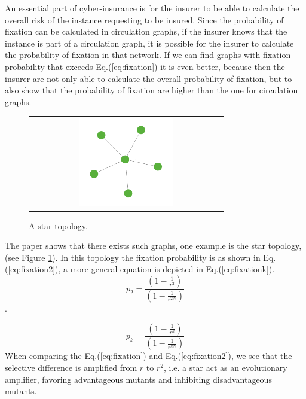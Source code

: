 An essential part of cyber-insurance is for the insurer to be able to calculate the overall risk of the instance requesting to be insured. Since the probability of fixation can be calculated in circulation graphs, if the insurer knows that the instance is part of a circulation graph, it is possible for the insurer to calculate the probability of fixation in that network. 
If we can find graphs with fixation probability that exceeds Eq.(\ref{eq:fixation}) it is even better, because then the insurer are not only able to calculate the overall probability of fixation, but to also show that the probability of fixation are higher than the one for circulation graphs.
\begin{figure}[b]
\centering
\begin{tabular}{@{}c@{}}
\includegraphics[width=0.5\textwidth]{../Figures/aStar.png}
\end{tabular}
\caption{
\label{fig:star} A star-topology. 
}
\end{figure}
The paper shows that there exists such graphs, one example is the star topology, (see Figure \ref{fig:star}).
In this topology the fixation probability is as shown in Eq.(\ref{eq:fixation2}), a more general equation is depicted in Eq.(\ref{eq:fixationk}). \begin{equation}p_{2}=\frac{(1-\frac{1}{r^{2}})}{(1-\frac{1}{r^{2N}})} \label{eq:fixation2} \end{equation}.

\begin{equation}
p_{k}=\frac{(1-\frac{1}{r^{k}})}{(1-\frac{1}{r^{kN}})} \label{eq:fixationk}
\end{equation}
 When comparing the Eq.(\ref{eq:fixation}) and Eq.(\ref{eq:fixation2}), we see that the selective difference is
 amplified from $r$ to $r^{2}$, i.e. a star act as an evolutionary amplifier, favoring advantageous
  mutants and inhibiting disadvantageous mutants.

